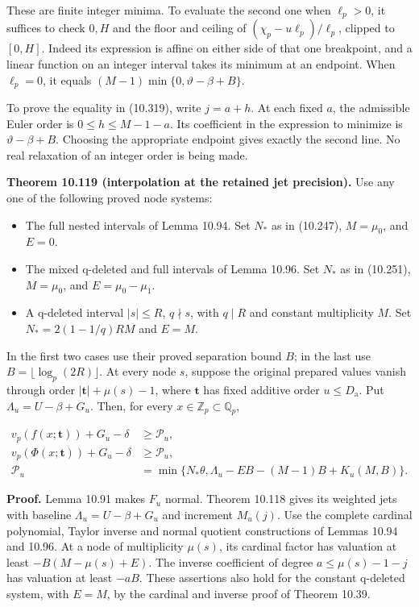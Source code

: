 \documentclass[
  11pt,
  a4paper,
]{article}
\providecommand{\tightlist}{%
  \setlength{\itemsep}{0pt}\setlength{\parskip}{0pt}}
\begin{document}
These are finite integer minima. To evaluate the second one when
\(\ell_p>0\), it suffices to check \(0,H\) and the floor and ceiling of
\((\chi_p-u\ell_p)/\ell_p\), clipped to \([0,H]\). Indeed its expression
is affine on either side of that one breakpoint, and a linear function
on an integer interval takes its minimum at an endpoint. When
\(\ell_p=0\), it equals \((M-1)\min\{0,\vartheta-\beta+B\}\).

To prove the equality in (10.319), write \(j=a+h\). At each fixed \(a\),
the admissible Euler order is \(0\le h\le M-1-a\). Its coefficient in
the expression to minimize is \(\vartheta-\beta+B\). Choosing the
appropriate endpoint gives exactly the second line. No real relaxation
of an integer order is being made.

\textbf{Theorem 10.119 (interpolation at the retained jet precision).}
Use any one of the following proved node systems:

\begin{itemize}
\tightlist
\item
  The full nested intervals of Lemma 10.94. Set \(N_*\) as in (10.247),
  \(M=\mu_0\), and \(E=0\).
\item
  The mixed q-deleted and full intervals of Lemma 10.96. Set \(N_*\) as
  in (10.251), \(M=\mu_0\), and \(E=\mu_0-\mu_1\).
\item
  A q-deleted interval \(|s|\le R\), \(q\nmid s\), with \(q\mid R\) and
  constant multiplicity \(M\). Set \(N_*=2(1-1/q)RM\) and \(E=M\).
\end{itemize}

In the first two cases use their proved separation bound \(B\); in the
last use \(B=\lfloor\log_p(2R)\rfloor\). At every node \(s\), suppose
the original prepared values vanish through order
\(|\boldsymbol t|+\mu(s)-1\), where \(\boldsymbol t\) has fixed additive
order \(u\le D_{\mathrm a}\). Put \(\Lambda_u=U-\beta+G_u\). Then, for
every \(x\in\mathbb Z_p\subset\mathbb Q_p\),

\[
\begin{aligned}
v_p(f(x;\boldsymbol t))+G_u-\delta&\ge\mathcal P_u,\\
v_p(\Phi(x;\boldsymbol t))+G_u-\delta&\ge\mathcal P_u,\\
\mathcal P_u&=\min\{N_*\theta,\Lambda_u-EB-(M-1)B+K_u(M,B)\}.
\end{aligned}
\tag{10.320}
\]

\textbf{Proof.} Lemma 10.91 makes \(F_u\) normal. Theorem 10.118 gives
its weighted jets with baseline \(\Lambda_u=U-\beta+G_u\) and increment
\(M_u(j)\). Use the complete cardinal polynomial, Taylor inverse and
normal quotient constructions of Lemmas 10.94 and 10.96. At a node of
multiplicity \(\mu(s)\), its cardinal factor has valuation at least
\(-B(M-\mu(s)+E)\). The inverse coefficient of degree \(a\le\mu(s)-1-j\)
has valuation at least \(-aB\). These assertions also hold for the
constant q-deleted system, with \(E=M\), by the cardinal and inverse
proof of Theorem 10.39.
\end{document}
